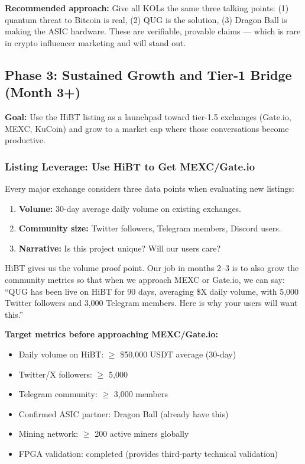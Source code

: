 \documentclass[11pt,a4paper]{article}
\begin{document}
\textbf{Recommended approach:} Give all KOLs the same three talking points: (1) quantum threat to Bitcoin is real, (2) QUG is the solution, (3) Dragon Ball is making the ASIC hardware. These are verifiable, provable claims — which is rare in crypto influencer marketing and will stand out.

\subsection{Phase 3: Sustained Growth and Tier-1 Bridge (Month 3+)}

\textbf{Goal:} Use the HiBT listing as a launchpad toward tier-1.5 exchanges (Gate.io, MEXC, KuCoin) and grow to a market cap where those conversations become productive.

\subsubsection{Listing Leverage: Use HiBT to Get MEXC/Gate.io}

Every major exchange considers three data points when evaluating new listings:
\begin{enumerate}[leftmargin=1.5em]
  \item \textbf{Volume:} 30-day average daily volume on existing exchanges.
  \item \textbf{Community size:} Twitter followers, Telegram members, Discord users.
  \item \textbf{Narrative:} Is this project unique? Will our users care?
\end{enumerate}

HiBT gives us the volume proof point. Our job in months 2--3 is to also grow the community metrics so that when we approach MEXC or Gate.io, we can say: ``QUG has been live on HiBT for 90 days, averaging \$X daily volume, with 5,000 Twitter followers and 3,000 Telegram members. Here is why your users will want this.''

\begin{goldbox}
\textbf{Target metrics before approaching MEXC/Gate.io:}
\begin{itemize}[leftmargin=1em, itemsep=0pt]
  \item Daily volume on HiBT: $\geq$ \$50,000 USDT average (30-day)
  \item Twitter/X followers: $\geq$ 5,000
  \item Telegram community: $\geq$ 3,000 members
  \item Confirmed ASIC partner: Dragon Ball (already have this)
  \item Mining network: $\geq$ 200 active miners globally
  \item FPGA validation: completed (provides third-party technical validation)
\end{itemize}
\end{goldbox}
\end{document}
